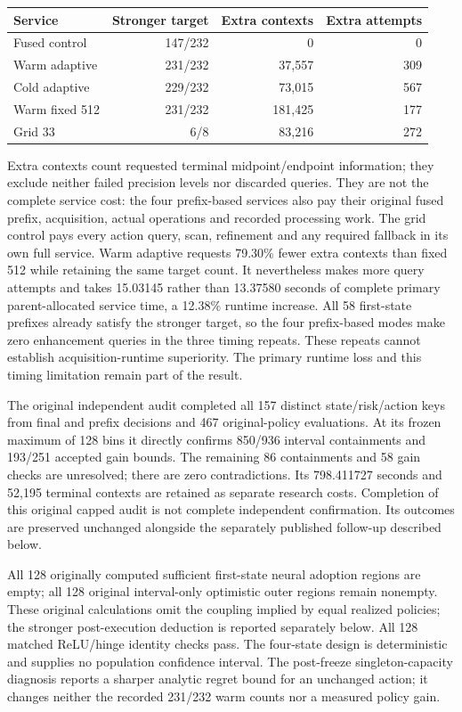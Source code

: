 \begin{center}\small
\begin{tabular}{lrrr}
\hline
Service & Stronger target & Extra contexts & Extra attempts\\
\hline
Fused control & 147/232 & 0 & 0\\
Warm adaptive & 231/232 & 37,557 & 309\\
Cold adaptive & 229/232 & 73,015 & 567\\
Warm fixed 512 & 231/232 & 181,425 & 177\\
Grid 33 & 6/8 & 83,216 & 272\\
\hline
\end{tabular}
\end{center}

Extra contexts count requested terminal midpoint/endpoint information;
they exclude neither failed precision levels nor discarded queries. They
are not the complete service cost: the four prefix-based services also pay
their original fused prefix, acquisition, actual operations and recorded
processing work. The grid control pays every action query, scan, refinement
and any required fallback in its own full service.
Warm adaptive requests 79.30\% fewer extra contexts than fixed 512 while
retaining the same target count. It nevertheless makes more query attempts
and takes 15.03145 rather than 13.37580 seconds of complete primary
parent-allocated service time, a 12.38\% runtime increase. All 58 first-state
prefixes already satisfy the stronger target, so the four prefix-based
modes make zero enhancement queries in the three timing repeats. These
repeats cannot establish acquisition-runtime superiority. The primary
runtime loss and this timing limitation remain part of the result.

The original independent audit completed all 157 distinct state/risk/action
keys from final and prefix decisions and 467 original-policy evaluations.
At its frozen maximum of
128 bins it directly confirms 850/936 interval containments and 193/251
accepted gain bounds. The remaining 86 containments and 58 gain checks
are unresolved; there are zero contradictions. Its 798.411727 seconds and
52,195 terminal contexts are retained as separate research costs.
Completion of this original capped audit is not complete independent
confirmation. Its outcomes are preserved unchanged alongside the separately
published follow-up described below.

All 128 originally computed sufficient first-state neural adoption regions
are empty; all 128 original interval-only optimistic outer regions remain
nonempty. These original calculations omit the coupling implied by equal
realized policies; the stronger post-execution deduction is reported
separately below. All 128 matched ReLU/hinge
identity checks pass. The four-state design is deterministic and supplies
no population confidence interval. The post-freeze singleton-capacity
diagnosis reports a sharper analytic regret bound for an unchanged action;
it changes neither the recorded 231/232 warm counts nor a measured policy gain.

